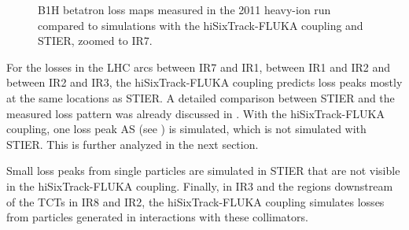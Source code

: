 \begin{figure}[t]
  \centering
  \footnotesize
  \caption{B1H betatron loss maps measured in the 2011 heavy-ion run compared to simulations with the hiSixTrack-FLUKA coupling and STIER, zoomed to IR7.}  
  \label{pic:16070803}
  \end{figure}


For the losses in the LHC arcs between IR7 and IR1, between IR1 and IR2 and between IR2 and IR3, the hiSixTrack-FLUKA coupling predicts loss peaks mostly at the same locations as STIER. A detailed comparison between STIER and the measured loss pattern was already discussed in . With the hiSixTrack-FLUKA coupling, one loss peak AS (see ) is simulated, which is not simulated with STIER. This is further analyzed in the next section. 


Small loss peaks from single particles are simulated in STIER that are not visible in the hiSixTrack-FLUKA coupling. Finally, in IR3 and the regions downstream of the TCTs in IR8 and IR2, the hiSixTrack-FLUKA coupling simulates losses from particles generated in interactions with these collimators. 

